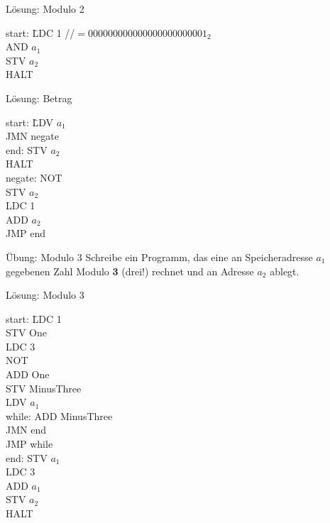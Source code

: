 \begin{frame}{Lösung: Modulo 2}
	\begin{tabbing}
		start: \; \= LDC 1 \quad  //$= 000000000000000000000001_2$ \\
				\> AND $a_1$ \\
				\> STV $a_2$ \\
				\> HALT
	\end{tabbing}
\end{frame}

\begin{frame}{Lösung: Betrag}
	\begin{tabbing}
		start: \quad \= LDV $a_1$ \\
					 \> JMN negate \\
		end: 		 \> STV $a_2$ \\
					 \> HALT \\
		negate:		 \> NOT \\
					 \> STV $a_2$ \\
					 \> LDC 1 \\
					 \> ADD $a_2$  \\
					 \> JMP end	 \\		 
	\end{tabbing}
\end{frame}

\begin{frame}{Übung: Modulo 3}
	Schreibe ein Programm, das eine an Speicheradresse $a_1$ gegebenen Zahl Modulo \textbf{3} (drei!) rechnet und an Adresse $a_2$ ablegt.
\end{frame}

\begin{frame}{Lösung: Modulo 3}
  \begin{tabbing}
    start: \quad \= LDC 1 \\
           \> STV One\\
           \> LDC 3\\
           \> NOT\\
           \> ADD One\\
           \> STV MinusThree\\
           \> LDV $a_1$\\
    \medskip
    while: \> ADD MinusThree\\
           \> JMN end\\
           \> JMP while\\
    \medskip
    end:   \> STV $a_1$\\
           \> LDC 3\\
           \> ADD $a_1$\\
           \> STV $a_2$ \\
           \> HALT\\
  \end{tabbing}
\end{frame}